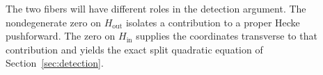 The two fibers will have different roles in the detection argument.
The nondegenerate zero on $H_{\mathrm{out}}$ isolates a contribution
to a proper Hecke pushforward.  The zero on $H_{\mathrm{in}}$ supplies
the coordinates transverse to that contribution and yields the exact
split quadratic equation of Section~\ref{sec:detection}.
